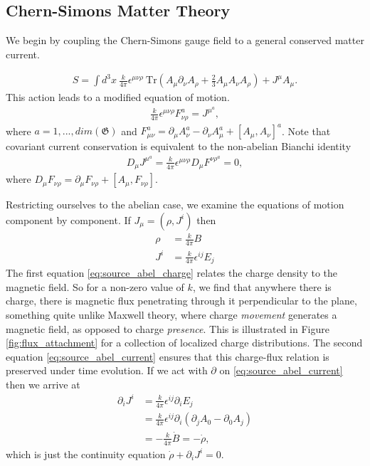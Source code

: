     \subsection{Chern-Simons Matter Theory}
    
    We begin by coupling the Chern-Simons gauge field to a general conserved matter current.


    \begin{align}
        S = \int d^3x \ \frac{k}{4 \pi} \epsilon^{\mu \nu \rho} \ \mathrm{Tr} \left(A_{\mu} \partial_{\nu} A_{\rho}+ \frac{2}{3} A_{\mu} A_{\nu} A_{\rho} \right) + J^{\mu} A_{\mu}.
    \end{align}
    This action leads to a modified equation of motion.
    \begin{align}
        \frac{k}{4 \pi} \epsilon^{\mu \nu \rho} F^a_{\nu \rho} = J^{\mu}^a,
    \end{align}
    where $a=1,...,dim(\mathfrak{G})$ and $F_{\mu \nu}^a = \partial_{\mu} A_{\nu}^a - \partial_{\nu} A_{\mu}^a + [A_{\mu}, A_{\nu}]^a$. Note that covariant current conservation is equivalent to the non-abelian Bianchi identity
    \begin{align}
        D_{\mu} J^{\mu}^a = \frac{k}{4 \pi} \epsilon^{\mu \nu \rho} D_{\mu} F^{\nu \rho}^a = 0,
    \end{align}
    where $D_{\mu} F_{\nu \rho} = \partial_{\mu} F_{\nu \rho} + [A_{\mu}, F_{\nu \rho}]$.

    Restricting ourselves to the abelian case, we examine the equations of motion component by component. If $J_{\mu} = (\rho, J^i)$ then
    \begin{align}
        \rho  &= \frac{k}{4 \pi} B \label{eq:source_abel_charge} \\
        J^i &= \frac{k}{4 \pi} \epsilon^{i j } E_j \label{eq:source_abel_current}
    \end{align}
    The first equation \eqref{eq:source_abel_charge} relates the charge density to the magnetic field. So for a non-zero value of $k$, we find that anywhere there is charge, there is magnetic flux penetrating through it perpendicular to the plane, something quite unlike Maxwell theory, where charge \textit{movement} generates a magnetic field, as opposed to charge \textit{presence}. This is illustrated in  Figure \ref{fig:flux_attachment} for a collection of localized charge distributions. The second equation \eqref{eq:source_abel_current} ensures that this charge-flux relation is preserved under time evolution. If we act with $\partial$ on \eqref{eq:source_abel_current} then we arrive at
    \begin{align}
        \partial_i J^i &= \frac{k}{4 \pi} \epsilon^{ij} \partial_i E_j\nonumber \\
        &= \frac{k}{4 \pi} \epsilon^{ij} \partial_i ( \partial_j A_0 - \partial_0 A_j) \nonumber \\
        &= -\frac{k}{4 \pi} \dot{B} = -\dot{\rho},
    \end{align}
    which is just the continuity equation $\dot{\rho} + \partial_i J^i=0$.





